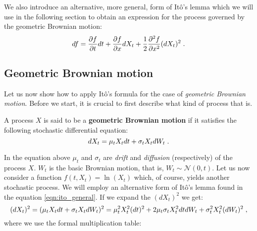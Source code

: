 \documentclass[times, utf8, diplomski]{fer}
\begin{document}
\noindent We also introduce an alternative, more general, form of It\^{o}'s lemma which we will use in the following section to obtain an expression for the process governed by the geometric Brownian motion:
\begin{equation} \label{eqn:ito_general}
	df = \frac{\partial f}{\partial t}dt + \frac{\partial f}{\partial x}dX_t + \frac{1}{2}\frac{\partial^2 f}{\partial x^2}(dX_t)^2 \hspace{0.1cm}.
\end{equation}

\subsection{Geometric Brownian motion} \label{section_gbm}
Let us now show how to apply It\^{o}'s formula for the case of \textit{geometric Brownian motion}. Before we start, it is crucial to first describe what kind of process that is. 

\begin{definition}
A process $X$ is said to be a \textbf{geometric Brownian motion} if it satisfies the following stochastic differential equation:
	\begin{equation}
		dX_t = \mu_t X_t dt + \sigma_t X_t dW_t \hspace{0.1cm}.
	\end{equation}
\end{definition}

\noindent In the equation above $\mu_t$ and $\sigma_t$ are \textit{drift} and \textit{diffusion} (respectively) of the process $X$. $W_t$ is the basic Brownian motion, that is, $W_t \sim \mathcal{N}(0,t)$. Let us now consider a function $f(t,X_t) = \ln(X_t)$ which, of course, yields another stochastic process. We will employ an alternative form of It\^{o}'s lemma found in the equation \ref{eqn:ito_general}. If we expand the $(dX_t)^2$ we get: 
\begin{equation}
	(dX_t)^2 = (\mu_t X_t dt + \sigma_t X_t dW_t)^2 = \mu_t^2 X_t^2 (dt)^2 + 2\mu_t\sigma_tX_t^2dtdW_t + \sigma_t^2X_t^2(dW_t)^2 \hspace{0.1cm},
\end{equation}
where we use the formal multiplication table: 
\end{document}
